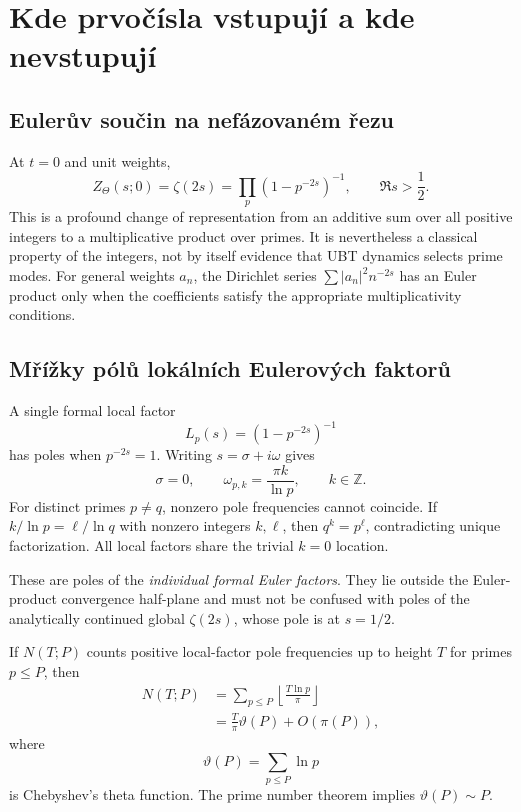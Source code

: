 \section{Kde prvočísla vstupují a kde nevstupují}

\subsection{Eulerův součin na nefázovaném řezu}

At $t=0$ and unit weights,
\begin{equation}
 Z_\Theta(s;0)=\zeta(2s)
 =\prod_{p}\left(1-p^{-2s}\right)^{-1},
 \qquad \Re s>\frac12.
 \label{eq:zeta-euler-product}
\end{equation}
This is a profound change of representation from an additive sum over all positive
integers to a multiplicative product over primes.  It is nevertheless a classical
property of the integers, not by itself evidence that UBT dynamics selects prime modes.
For general weights $a_n$, the Dirichlet series
$\sum |a_n|^2n^{-2s}$ has an Euler product only when the coefficients satisfy the
appropriate multiplicativity conditions.

\subsection{Mřížky pólů lokálních Eulerových faktorů}

A single formal local factor
\begin{equation}
 L_p(s)=\left(1-p^{-2s}\right)^{-1}
\end{equation}
has poles when $p^{-2s}=1$.  Writing $s=\sigma+i\omega$ gives
\begin{equation}
 \sigma=0,
 \qquad
 \omega_{p,k}=\frac{\pi k}{\ln p},
 \qquad k\in\mathbb Z.
 \label{eq:local-prime-poles}
\end{equation}
For distinct primes $p\neq q$, nonzero pole frequencies cannot coincide.  If
$k/\ln p=\ell/\ln q$ with nonzero integers $k,\ell$, then
$q^k=p^\ell$, contradicting unique factorization.  All local factors share the trivial
$k=0$ location.

These are poles of the \emph{individual formal Euler factors}.  They lie outside the
Euler-product convergence half-plane and must not be confused with poles of the
analytically continued global $\zeta(2s)$, whose pole is at $s=1/2$.

If $N(T;P)$ counts positive local-factor pole frequencies up to height $T$ for primes
$p\le P$, then
\begin{align}
 N(T;P)
 &=\sum_{p\le P}\left\lfloor\frac{T\ln p}{\pi}\right\rfloor\\
 &=\frac{T}{\pi}\vartheta(P)+O(\pi(P)),
 \label{eq:local-pole-count}
\end{align}
where
\begin{equation}
 \vartheta(P)=\sum_{p\le P}\ln p
\end{equation}
is Chebyshev's theta function.  The prime number theorem implies
$\vartheta(P)\sim P$.

